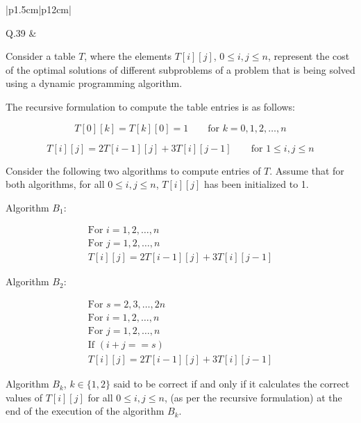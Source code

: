 \documentclass[14pt]{article}
\renewcommand{\arraystretch}{1.25}
\begin{document}
\renewcommand{\arraystretch}{1}

\vspace{0.3cm}

\newpage

\vspace{0.3cm}

\renewcommand{\arraystretch}{1.25}

\vspace{0.3cm}

\renewcommand{\arraystretch}{1.25}

\begin{tabular}{|p{1.5cm}|p{12cm}|}
\hline

Q.39 &
\parbox[t]{\linewidth}{
\small
\vspace{0.05cm}
Consider a table $T$, where the elements $T[i][j]$, $0\leq i,j\leq n$,
represent the cost of the optimal solutions of different subproblems
of a problem that is being solved using a dynamic programming algorithm.

The recursive formulation to compute the table entries is as follows:

\[
T[0][k]=T[k][0]=1 \qquad \text{for } k=0,1,2,\ldots,n
\]

\[
T[i][j]=2T[i-1][j]+3T[i][j-1]\qquad \text{for }1\leq i,j\leq n
\]

Consider the following two algorithms to compute entries of $T$.
Assume that for both algorithms, for all $0\leq i,j\leq n$, $T[i][j]$
has been initialized to 1.

Algorithm $B_1$:

\[
\begin{array}{c}
\text{For } i=1,2,\ldots,n\\[0.25cm]
\text{For } j=1,2,\ldots,n\\[0.25cm]
T[i][j]=2T[i-1][j]+3T[i][j-1]
\end{array}
\]

Algorithm $B_2$:

\[
\begin{array}{c}
\text{For } s=2,3,\ldots,2n\\[0.25cm]
\text{For } i=1,2,\ldots,n\\[0.25cm]
\text{For } j=1,2,\ldots,n\\[0.25cm]
\text{If }(i+j==s)\\[0.25cm]
T[i][j]=2T[i-1][j]+3T[i][j-1]
\end{array}
\]

Algorithm $B_k$, $k\in\{1,2\}$ said to be correct if and only if it
calculates the correct values of $T[i][j]$ for all $0\leq i,j\leq n$,
(as per the recursive formulation) at the end of the execution of the
algorithm $B_k$.

}
\end{tabular}
\end{document}
